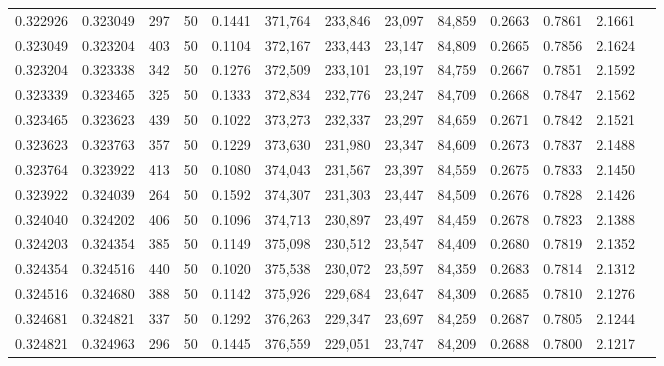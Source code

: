 \begin{tabular}{rrrrrrrrrrrrr}
0.322926 & 0.323049 &   297 &  50 &                                     0.1441 & 371,764 & 233,846 &  23,097 &  84,859 & 0.2663 & 0.7861 & 2.1661 \\
0.323049 & 0.323204 &   403 &  50 &                                     0.1104 & 372,167 & 233,443 &  23,147 &  84,809 & 0.2665 & 0.7856 & 2.1624 \\
0.323204 & 0.323338 &   342 &  50 &                                     0.1276 & 372,509 & 233,101 &  23,197 &  84,759 & 0.2667 & 0.7851 & 2.1592 \\
0.323339 & 0.323465 &   325 &  50 &                                     0.1333 & 372,834 & 232,776 &  23,247 &  84,709 & 0.2668 & 0.7847 & 2.1562 \\
0.323465 & 0.323623 &   439 &  50 &                                     0.1022 & 373,273 & 232,337 &  23,297 &  84,659 & 0.2671 & 0.7842 & 2.1521 \\
0.323623 & 0.323763 &   357 &  50 &                                     0.1229 & 373,630 & 231,980 &  23,347 &  84,609 & 0.2673 & 0.7837 & 2.1488 \\
0.323764 & 0.323922 &   413 &  50 &                                     0.1080 & 374,043 & 231,567 &  23,397 &  84,559 & 0.2675 & 0.7833 & 2.1450 \\
0.323922 & 0.324039 &   264 &  50 &                                     0.1592 & 374,307 & 231,303 &  23,447 &  84,509 & 0.2676 & 0.7828 & 2.1426 \\
0.324040 & 0.324202 &   406 &  50 &                                     0.1096 & 374,713 & 230,897 &  23,497 &  84,459 & 0.2678 & 0.7823 & 2.1388 \\
0.324203 & 0.324354 &   385 &  50 &                                     0.1149 & 375,098 & 230,512 &  23,547 &  84,409 & 0.2680 & 0.7819 & 2.1352 \\
0.324354 & 0.324516 &   440 &  50 &                                     0.1020 & 375,538 & 230,072 &  23,597 &  84,359 & 0.2683 & 0.7814 & 2.1312 \\
0.324516 & 0.324680 &   388 &  50 &                                     0.1142 & 375,926 & 229,684 &  23,647 &  84,309 & 0.2685 & 0.7810 & 2.1276 \\
0.324681 & 0.324821 &   337 &  50 &                                     0.1292 & 376,263 & 229,347 &  23,697 &  84,259 & 0.2687 & 0.7805 & 2.1244 \\
0.324821 & 0.324963 &   296 &  50 &                                     0.1445 & 376,559 & 229,051 &  23,747 &  84,209 & 0.2688 & 0.7800 & 2.1217 \\

\end{tabular}
